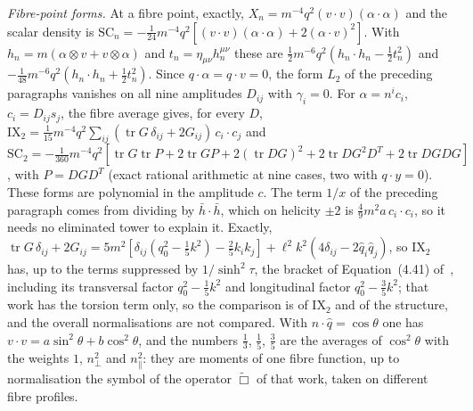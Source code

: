 \emph{Fibre-point forms.} At a fibre point, exactly, \(X_n=m^{-4}q^2(v\cdot v)(\alpha\cdot\alpha)\) and the scalar density is \(\mathrm{SC}_n=-\tfrac1{24}m^{-4}q^2[(v\cdot v)(\alpha\cdot\alpha)+2(\alpha\cdot v)^2]\). With \(h_n=m(\alpha\otimes v+v\otimes\alpha)\) and \(t_n=\eta_{\mu\nu}h_n^{\mu\nu}\) these are \(\tfrac12m^{-6}q^2(h_n\cdot h_n-\tfrac12t_n^2)\) and \(-\tfrac1{48}m^{-6}q^2(h_n\cdot h_n+\tfrac12t_n^2)\). Since \(q\cdot\alpha=q\cdot v=0\), the form \(L_2\) of the preceding paragraphs vanishes on all nine amplitudes \(D_{ij}\) with \(\gamma_i=0\). For \(\alpha=n^ic_i\), \(c_i=D_{ij}s_j\), the fibre average gives, for every \(D\), \(\mathrm{IX}_2=\tfrac1{15}m^{-4}q^2\sum_{ij}(\operatorname{tr}G\,\delta_{ij}+2G_{ij})\,c_i\cdot c_j\) and \(\mathrm{SC}_2=-\tfrac1{360}m^{-4}q^2[\operatorname{tr}G\operatorname{tr}P+2\operatorname{tr}GP+2(\operatorname{tr}DG)^2+2\operatorname{tr}DG^2D^{T}+2\operatorname{tr}DGDG]\), with \(P=DGD^{T}\) (exact rational arithmetic at nine cases, two with \(q\cdot y=0\)). These forms are polynomial in the amplitude \(c\). The term \(1/x\) of the preceding paragraph comes from dividing by \(\bar h\cdot\bar h\), which on helicity \(\pm2\) is \(\tfrac49m^2a\,c_i\cdot c_i\), so it needs no eliminated tower to explain it. Exactly, \(\operatorname{tr}G\,\delta_{ij}+2G_{ij}=5m^2[\delta_{ij}(q_0^2-\tfrac15k^2)-\tfrac25k_ik_j]+\ell^2k^2(4\delta_{ij}-2\hat q_i\hat q_j)\), so \(\mathrm{IX}_2\) has, up to the terms suppressed by \(1/\sinh^2\tau\), the bracket of Equation~(4.41) of~\cite{Steinacker2026}, including its transversal factor \(q_0^2-\tfrac15k^2\) and longitudinal factor \(q_0^2-\tfrac35k^2\); that work has the torsion term only, so the comparison is of \(\mathrm{IX}_2\) and of the structure, and the overall normalisations are not compared. With \(n\cdot\hat q=\cos\theta\) one has \(v\cdot v=a\sin^2\theta+b\cos^2\theta\), and the numbers \(\tfrac13\), \(\tfrac15\), \(\tfrac35\) are the averages of \(\cos^2\theta\) with the weights \(1\), \(n_\perp^2\) and \(n_\parallel^2\): they are moments of one fibre function, up to normalisation the symbol of the operator \(\tilde\Box\) of that work, taken on different fibre profiles.

